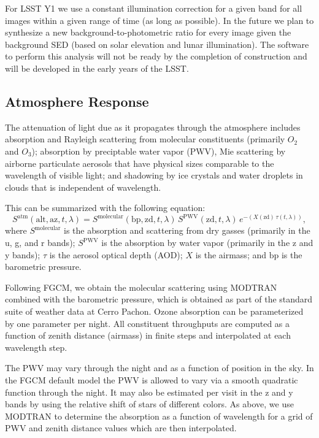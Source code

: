 \documentclass[SE,authoryear,lsstdraft,toc]{lsstdoc}
\begin{document}
For LSST Y1 we use a constant illumination correction for a given band for all images within a given range of time (as long as possible).
In the future we plan to synthesize a new background-to-photometric ratio for every image given the background SED (based on solar elevation and lunar illumination).
The software to perform this analysis will not be ready by the completion of construction and will be developed in the early years of the LSST.

\subsection{Atmosphere Response}

The attenuation of light due as it propagates through the atmosphere includes absorption and Rayleigh scattering from molecular constituents (primarily $O_2$ and $O_3$); absorption by preciptable water vapor (PWV), Mie scattering by airborne particulate aerosols that have physical sizes comparable to the wavelength of visible light; and shadowing by ice crystals and water droplets in clouds that is independent of wavelength.

This can be summarized with the following equation:
%
\begin{equation}
S^{\mathrm{atm}}(\mathrm{alt}, \mathrm{az}, t, \lambda) =
S^{\mathrm{molecular}}(\mathrm{bp}, \mathrm{zd}, t,
\lambda)\,S^{\mathrm{PWV}}(\mathrm{zd}, t,
\lambda)\,e^{-(X(\mathrm{zd})\,\tau(t, \lambda))},
\end{equation}
%
where $S^{\mathrm{molecular}}$ is the absorption and scattering from dry gasses (primarily in the u, g, and r bands); $S^{\mathrm{PWV}}$ is the absorption by water vapor (primarily in the z and y bands); $\tau$ is the aerosol optical depth (AOD); $X$ is the airmass; and $\mathrm{bp}$ is the barometric pressure.

Following FGCM, we obtain the molecular scattering using MODTRAN \citep{1999SPIE.3756..348B} combined with the barometric pressure, which is obtained as part of the standard suite of weather data at Cerro Pachon.
Ozone absorption can be parameterized by one parameter per night.
All constituent throughputs are computed as a function of zenith distance (airmass) in finite steps and interpolated at each wavelength step.

The PWV may vary through the night and as a function of position in the sky.
In the FGCM default model the PWV is allowed to vary via a smooth quadratic function through the night.
It may also be estimated per visit in the z and y bands by using the relative shift of stars of different colors.
As above, we use MODTRAN to determine the absorption as a function of wavelength for a grid of PWV and zenith distance values which are then interpolated.
\end{document}

